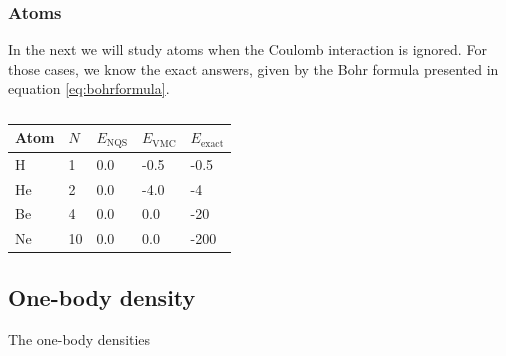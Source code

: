 \subsubsection{Atoms}
In the next we will study atoms when the Coulomb interaction is ignored. For those cases, we know the exact answers, given by the Bohr formula presented in equation \eqref{eq:bohrformula}.
\begin{table} [H]
	\caption{ }
	\begin{tabularx}{\textwidth}{X|X|X:X:X} \hline\hline
		\label{tab:nointeractionatoms}
		Atom & $N$ & $E_{\text{NQS}}$ & $E_{\text{VMC}}$ & $E_{\text{exact}}$ \\ \hline
		H & 1 & 0.0 & -0.5 & -0.5 \\ 
		He & 2 & 0.0 & -4.0 & -4 \\
		Be & 4 & 0.0 & 0.0 & -20 \\
		Ne & 10 & 0.0 & 0.0 & -200 \\ \hline\hline
	\end{tabularx}
\end{table}


\subsection{One-body density}
The one-body densities 

